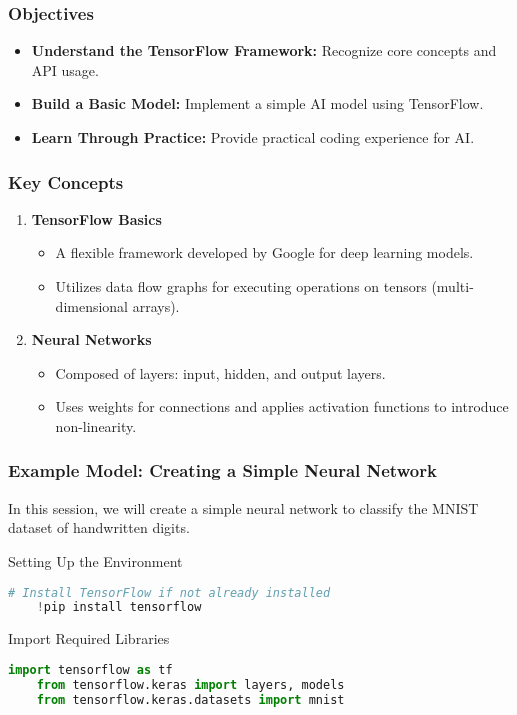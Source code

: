 \documentclass[aspectratio=169]{beamer}
\begin{document}
\begin{frame}[fragile]
    \frametitle{Objectives}
    \begin{itemize}
        \item \textbf{Understand the TensorFlow Framework:} Recognize core concepts and API usage.
        \item \textbf{Build a Basic Model:} Implement a simple AI model using TensorFlow.
        \item \textbf{Learn Through Practice:} Provide practical coding experience for AI.
    \end{itemize}
\end{frame}

\begin{frame}[fragile]
    \frametitle{Key Concepts}
    \begin{enumerate}
        \item \textbf{TensorFlow Basics}
        \begin{itemize}
            \item A flexible framework developed by Google for deep learning models.
            \item Utilizes data flow graphs for executing operations on tensors (multi-dimensional arrays).
        \end{itemize}

        \item \textbf{Neural Networks}
        \begin{itemize}
            \item Composed of layers: input, hidden, and output layers.
            \item Uses weights for connections and applies activation functions to introduce non-linearity.
        \end{itemize}
    \end{enumerate}
\end{frame}

\begin{frame}[fragile]
    \frametitle{Example Model: Creating a Simple Neural Network}
    In this session, we will create a simple neural network to classify the MNIST dataset of handwritten digits.

    \begin{block}{Setting Up the Environment}
    \begin{lstlisting}[language=Python]
    # Install TensorFlow if not already installed
    !pip install tensorflow
    \end{lstlisting}
    \end{block}

    \begin{block}{Import Required Libraries}
    \begin{lstlisting}[language=Python]
    import tensorflow as tf
    from tensorflow.keras import layers, models
    from tensorflow.keras.datasets import mnist
    \end{lstlisting}
    \end{block}
\end{frame}
\end{document}
